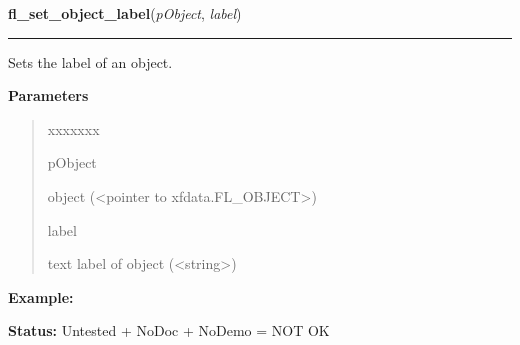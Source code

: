 \hspace{.8\funcindent}\begin{boxedminipage}{\funcwidth}

    \raggedright \textbf{fl\_set\_object\_label}(\textit{pObject}, \textit{label})

    \vspace{-1.5ex}

    \rule{\textwidth}{0.5\fboxrule}
\setlength{\parskip}{2ex}
    Sets the label of an object.

\setlength{\parskip}{1ex}
      \textbf{Parameters}
      \vspace{-1ex}

      \begin{quote}
        \begin{Ventry}{xxxxxxx}

          \item[pObject]

          object ({\textless}pointer to xfdata.FL\_OBJECT{\textgreater})

          \item[label]

          text label of object ({\textless}string{\textgreater})

        \end{Ventry}

      \end{quote}

\textbf{Example:} 

\textbf{Status:} Untested + NoDoc + NoDemo = NOT OK



    \end{boxedminipage}

    \label{xformslib:library:fl_get_object_label}

    \vspace{0.5ex}

